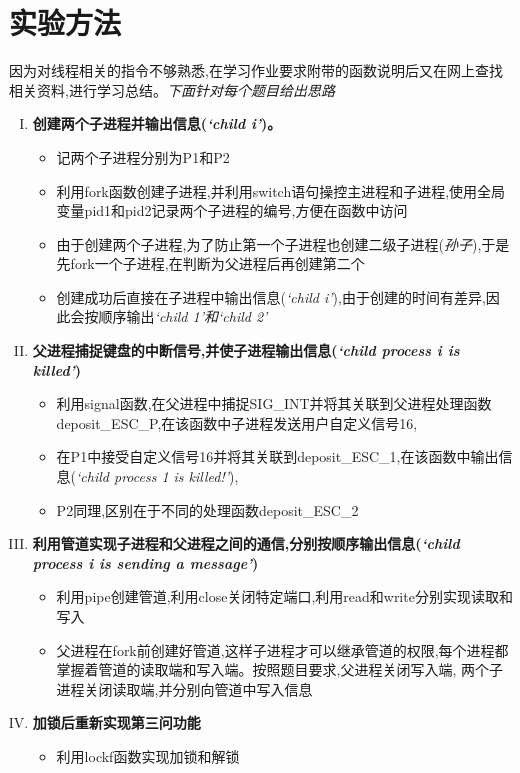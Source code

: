 \documentclass[UTF8]{ctexart}
\begin{document}
\section{实验方法}
因为对线程相关的指令不够熟悉,在学习作业要求附带的函数说明后又在网上查找相关资料,进行学习总结。\emph{下面针对每个题目给出思路}
\begin{enumerate}[I.]
    \item \textbf{创建两个子进程并输出信息(\emph{‘child i’})。}
    \begin{itemize}
        \item 记两个子进程分别为P1和P2
        \item 利用fork函数创建子进程,并利用switch语句操控主进程和子进程,使用全局变量pid1和pid2记录两个子进程的编号,方便在函数中访问
        \item 由于创建两个子进程,为了防止第一个子进程也创建二级子进程(\emph{孙子}),于是先fork一个子进程,在判断为父进程后再创建第二个
        \item 创建成功后直接在子进程中输出信息(\emph{‘child i’}),由于创建的时间有差异,因此会按顺序输出\emph{‘child 1’和‘child 2’}
    \end{itemize}
    \item \textbf{父进程捕捉键盘的中断信号,并使子进程输出信息(\emph{‘child process i is killed’})}
    \begin{itemize}
        \item 利用signal函数,在父进程中捕捉SIG\_INT并将其关联到父进程处理函数deposit\_ESC\_P,在该函数中子进程发送用户自定义信号16,
        \item 在P1中接受自定义信号16并将其关联到deposit\_ESC\_1,在该函数中输出信息(\emph{‘child process 1 is killed!’}),
        \item P2同理,区别在于不同的处理函数deposit\_ESC\_2
    \end{itemize}
    \item \textbf{利用管道实现子进程和父进程之间的通信,分别按顺序输出信息(\emph{‘child process i is sending a message’})}
    \begin{itemize}
        \item 利用pipe创建管道,利用close关闭特定端口,利用read和write分别实现读取和写入
        \item 父进程在fork前创建好管道,这样子进程才可以继承管道的权限,每个进程都掌握着管道的读取端和写入端。按照题目要求,父进程关闭写入端,
        两个子进程关闭读取端,并分别向管道中写入信息
    \end{itemize}
    \item \textbf{加锁后重新实现第三问功能}
    \begin{itemize}
        \item 利用lockf函数实现加锁和解锁
    \end{itemize}
\end{enumerate}
\end{document}
